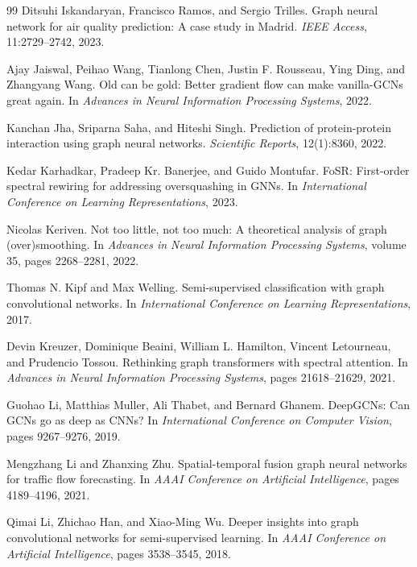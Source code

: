 \begin{thebibliography}{99}
Ditsuhi Iskandaryan, Francisco Ramos, and Sergio Trilles.
\newblock Graph neural network for air quality prediction: A case study in Madrid.
\newblock \emph{IEEE Access}, 11:2729--2742, 2023.

Ajay Jaiswal, Peihao Wang, Tianlong Chen, Justin F. Rousseau, Ying Ding, and Zhangyang Wang.
\newblock Old can be gold: Better gradient flow can make vanilla-GCNs great again.
\newblock In \emph{Advances in Neural Information Processing Systems}, 2022.

Kanchan Jha, Sriparna Saha, and Hiteshi Singh.
\newblock Prediction of protein-protein interaction using graph neural networks.
\newblock \emph{Scientific Reports}, 12(1):8360, 2022.

Kedar Karhadkar, Pradeep Kr. Banerjee, and Guido Montufar.
\newblock FoSR: First-order spectral rewiring for addressing oversquashing in GNNs.
\newblock In \emph{International Conference on Learning Representations}, 2023.

Nicolas Keriven.
\newblock Not too little, not too much: A theoretical analysis of graph (over)smoothing.
\newblock In \emph{Advances in Neural Information Processing Systems}, volume 35, pages 2268--2281, 2022.

Thomas N. Kipf and Max Welling.
\newblock Semi-supervised classification with graph convolutional networks.
\newblock In \emph{International Conference on Learning Representations}, 2017.

Devin Kreuzer, Dominique Beaini, William L. Hamilton, Vincent Letourneau, and Prudencio Tossou.
\newblock Rethinking graph transformers with spectral attention.
\newblock In \emph{Advances in Neural Information Processing Systems}, pages 21618--21629, 2021.

Guohao Li, Matthias Muller, Ali Thabet, and Bernard Ghanem.
\newblock DeepGCNs: Can GCNs go as deep as CNNs?
\newblock In \emph{International Conference on Computer Vision}, pages 9267--9276, 2019.

Mengzhang Li and Zhanxing Zhu.
\newblock Spatial-temporal fusion graph neural networks for traffic flow forecasting.
\newblock In \emph{AAAI Conference on Artificial Intelligence}, pages 4189--4196, 2021.

Qimai Li, Zhichao Han, and Xiao-Ming Wu.
\newblock Deeper insights into graph convolutional networks for semi-supervised learning.
\newblock In \emph{AAAI Conference on Artificial Intelligence}, pages 3538--3545, 2018.


\end{thebibliography}

